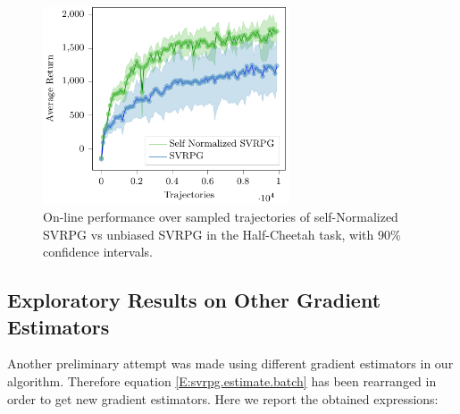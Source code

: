 \begin{figure}[t]
	\begin{minipage}[t]{1\textwidth}
		\centering
		\includegraphics[width=0.65\textwidth]{Images/Experiments/half_cheetah_SVRPG_vs_SN_SVRPG.pdf}
		\vspace{-0.1in}
		\caption{On-line performance over sampled trajectories of self-Normalized \acs{SVRPG} vs unbiased \acs{SVRPG} in the Half-Cheetah task, with 90\% confidence intervals.}
		\label{fig:hctwo}
	\end{minipage}
	\vspace{-0.15in}
\end{figure}
\newpage
\subsection{Exploratory Results on Other Gradient Estimators}\label{subsec:oge}
Another preliminary attempt was made using different gradient estimators in our algorithm. Therefore equation \eqref{E:svrpg.estimate.batch} has been rearranged in order to get new gradient estimators. Here we report the obtained expressions:

